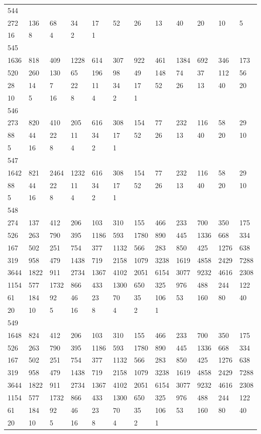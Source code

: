 \begin{longtable}{llllllllllll}
544&&&&&&&&&&&\\
272& 136& 68& 34& 17& 52& 26& 13& 40& 20& 10& 5\\
16& 8& 4& 2& 1& \\

545&&&&&&&&&&&\\
1636& 818& 409& 1228& 614& 307& 922& 461& 1384& 692& 346& 173\\
520& 260& 130& 65& 196& 98& 49& 148& 74& 37& 112& 56\\
28& 14& 7& 22& 11& 34& 17& 52& 26& 13& 40& 20\\
10& 5& 16& 8& 4& 2& 1& \\

546&&&&&&&&&&&\\
273& 820& 410& 205& 616& 308& 154& 77& 232& 116& 58& 29\\
88& 44& 22& 11& 34& 17& 52& 26& 13& 40& 20& 10\\
5& 16& 8& 4& 2& 1& \\

547&&&&&&&&&&&\\
1642& 821& 2464& 1232& 616& 308& 154& 77& 232& 116& 58& 29\\
88& 44& 22& 11& 34& 17& 52& 26& 13& 40& 20& 10\\
5& 16& 8& 4& 2& 1& \\

548&&&&&&&&&&&\\
274& 137& 412& 206& 103& 310& 155& 466& 233& 700& 350& 175\\
526& 263& 790& 395& 1186& 593& 1780& 890& 445& 1336& 668& 334\\
167& 502& 251& 754& 377& 1132& 566& 283& 850& 425& 1276& 638\\
319& 958& 479& 1438& 719& 2158& 1079& 3238& 1619& 4858& 2429& 7288\\
3644& 1822& 911& 2734& 1367& 4102& 2051& 6154& 3077& 9232& 4616& 2308\\
1154& 577& 1732& 866& 433& 1300& 650& 325& 976& 488& 244& 122\\
61& 184& 92& 46& 23& 70& 35& 106& 53& 160& 80& 40\\
20& 10& 5& 16& 8& 4& 2& 1& \\

549&&&&&&&&&&&\\
1648& 824& 412& 206& 103& 310& 155& 466& 233& 700& 350& 175\\
526& 263& 790& 395& 1186& 593& 1780& 890& 445& 1336& 668& 334\\
167& 502& 251& 754& 377& 1132& 566& 283& 850& 425& 1276& 638\\
319& 958& 479& 1438& 719& 2158& 1079& 3238& 1619& 4858& 2429& 7288\\
3644& 1822& 911& 2734& 1367& 4102& 2051& 6154& 3077& 9232& 4616& 2308\\
1154& 577& 1732& 866& 433& 1300& 650& 325& 976& 488& 244& 122\\
61& 184& 92& 46& 23& 70& 35& 106& 53& 160& 80& 40\\
20& 10& 5& 16& 8& 4& 2& 1& \\


\end{longtable}

